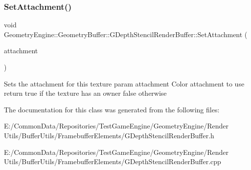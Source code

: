 \subsubsection{\texorpdfstring{SetAttachment()}{SetAttachment()}\hspace{0.1cm}{\footnotesize\ttfamily [2/2]}}
{\footnotesize\ttfamily void Geometry\+Engine\+::\+Geometry\+Buffer\+::\+G\+Depth\+Stencil\+Render\+Buffer\+::\+Set\+Attachment (\begin{DoxyParamCaption}\item[{G\+Framebuffer\+Commons\+::\+G\+\_\+\+D\+E\+P\+T\+H\+\_\+\+S\+T\+E\+N\+C\+I\+L\+\_\+\+A\+T\+T\+A\+C\+H\+M\+E\+N\+TS}]{attachment }\end{DoxyParamCaption})}

Sets the attachment for this texture param attachment Color attachment to use return true if the texture has an owner false otherwise 

The documentation for this class was generated from the following files\+:\begin{DoxyCompactItemize}
\item 
E\+:/\+Common\+Data/\+Repositories/\+Test\+Game\+Engine/\+Geometry\+Engine/\+Render Utils/\+Buffer\+Utils/\+Framebuffer\+Elements/G\+Depth\+Stencil\+Render\+Buffer.\+h\item 
E\+:/\+Common\+Data/\+Repositories/\+Test\+Game\+Engine/\+Geometry\+Engine/\+Render Utils/\+Buffer\+Utils/\+Framebuffer\+Elements/G\+Depth\+Stencil\+Render\+Buffer.\+cpp\end{DoxyCompactItemize}
